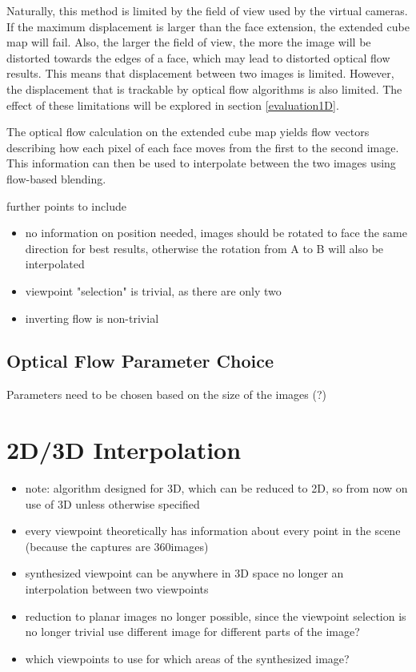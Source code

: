 Naturally, this method is limited by the field of view used by the virtual cameras. If the maximum displacement is larger than the face extension, the extended cube map will fail. Also, the larger the field of view, the more the image will be distorted towards the edges of a face, which may lead to distorted optical flow results. This means that displacement between two images is limited. However, the displacement that is trackable by optical flow algorithms is also limited. The effect of these limitations will be explored in section \ref{evaluation1D}.

The optical flow calculation on the extended cube map yields flow vectors describing how each pixel of each face moves from the first to the second image. This information can then be used to interpolate between the two images using flow-based blending.


further points to include
\begin{itemize}
\item no information on position needed, images should be rotated to face the same direction for best results, otherwise the rotation from A to B will also be interpolated
\item viewpoint "selection" is trivial, as there are only two
\item inverting flow is non-trivial
\end{itemize}


\subsection{Optical Flow Parameter Choice}
Parameters need to be chosen based on the size of the images (?)


\section{2D/3D Interpolation}

\begin{itemize}
    \item note: algorithm designed for 3D, which can be reduced to 2D, so from now on use of 3D unless otherwise specified
    \item every viewpoint theoretically has information about every point in the scene (because the captures are 360\degree images)
    \item synthesized viewpoint can be anywhere in 3D space \ar no longer an interpolation between two viewpoints
    \item reduction to planar images no longer possible, since the viewpoint selection is no longer trivial \ar use different image for different parts of the image?
    \item which viewpoints to use for which areas of the synthesized image?
\end{itemize}

